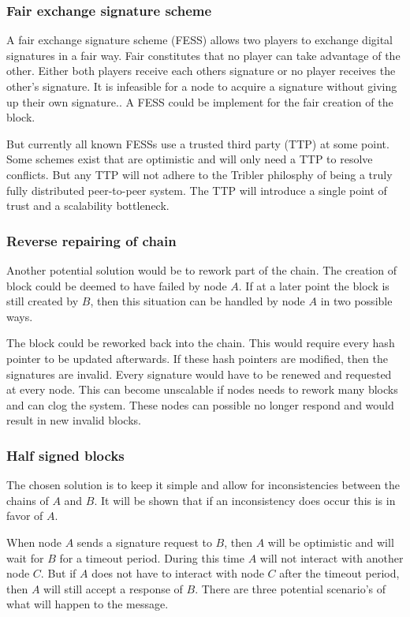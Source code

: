 \subsubsection{Fair exchange signature scheme}
A fair exchange signature scheme (FESS) allows two players to exchange digital signatures in a fair way.
Fair constitutes that no player can take advantage of the other.
Either both players receive each others signature or no player receives the other's signature.
It is infeasible for a node to acquire a signature without giving up their own signature.\cite{asokan-fairexchange}.
A FESS could be implement for the fair creation of the block.

But currently all known FESSs use a trusted third party (TTP) at some point\cite{asokan-fairexchange}.
Some schemes exist that are optimistic and will only need a TTP to resolve conflicts.
But any TTP will not adhere to the Tribler philosphy 
of being a truly fully distributed peer-to-peer system.
The TTP will introduce a single point of trust and a scalability bottleneck.

\subsubsection{Reverse repairing of chain}
Another potential solution would be to rework part of the chain.
The creation of block could be deemed to have failed by node $A$.
If at a later point the block is still created by $B$,
then this situation can be handled by node $A$ in two possible ways.

The block could be reworked back into the chain.
This would require every hash pointer to be updated afterwards.
If these hash pointers are modified, then the signatures are invalid.
Every signature would have to be renewed and requested at every node.
This can become unscalable if nodes needs to rework many blocks and can clog the system.
These nodes can possible no longer respond and would result in new invalid blocks.

\subsubsection{Half signed blocks}
\label{des:halfsigned}
The chosen solution is to keep it simple and allow for inconsistencies between the chains of $A$ and $B$.
It will be shown that if an inconsistency does occur this is in favor of $A$.

When node $A$ sends a signature request to $B$,
then $A$ will be optimistic and will wait for $B$ for a timeout period.
During this time $A$ will not interact with another node $C$.
But if $A$ does not have to interact with node $C$ after the timeout period,
then $A$ will still accept a response of $B$.
There are three potential scenario's of what will happen to the message.

